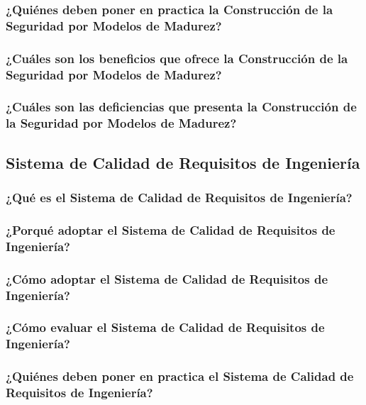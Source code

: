 \documentclass[runningheads,a4paper]{llncs}
\begin{document}
\subsubsection{¿Quiénes deben poner en practica la Construcción de la Seguridad por Modelos de Madurez?}

\subsubsection{¿Cuáles son los beneficios que ofrece la Construcción de la Seguridad por Modelos de Madurez?}

\subsubsection{¿Cuáles son las deficiencias que presenta la Construcción de la Seguridad por Modelos de Madurez?}


\subsection{Sistema de Calidad de Requisitos de Ingeniería}

\subsubsection{¿Qué es el Sistema de Calidad de Requisitos de Ingeniería?}

\subsubsection{¿Porqué adoptar el Sistema de Calidad de Requisitos de Ingeniería?}

\subsubsection{¿Cómo adoptar el Sistema de Calidad de Requisitos de Ingeniería?}

\subsubsection{¿Cómo evaluar el Sistema de Calidad de Requisitos de Ingeniería?}

\subsubsection{¿Quiénes deben poner en practica el Sistema de Calidad de Requisitos de Ingeniería?}
\end{document}
